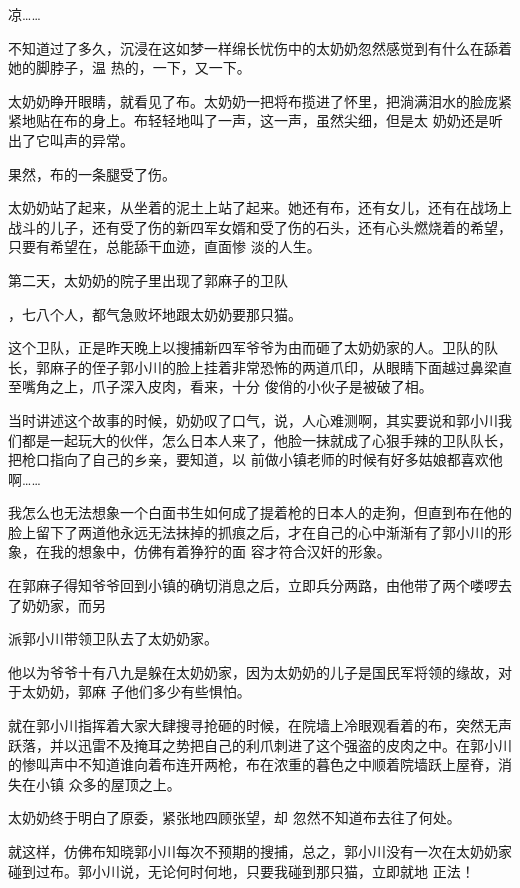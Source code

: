 \documentclass{article}
\begin{document}
凉…… 

不知道过了多久，沉浸在这如梦一样绵长忧伤中的太奶奶忽然感觉到有什么在舔着她的脚脖子，温
热的，一下，又一下。 

太奶奶睁开眼睛，就看见了布。太奶奶一把将布揽进了怀里，把淌满泪水的脸庞紧紧地贴在布的身上。布轻轻地叫了一声，这一声，虽然尖细，但是太
奶奶还是听出了它叫声的异常。 


果然，布的一条腿受了伤。 

太奶奶站了起来，从坐着的泥土上站了起来。她还有布，还有女儿，还有在战场上战斗的儿子，还有受了伤的新四军女婿和受了伤的石头，还有心头燃烧着的希望，只要有希望在，总能舔干血迹，直面惨
淡的人生。 

第二天，太奶奶的院子里出现了郭麻子的卫队

\newpage
，七八个人，都气急败坏地跟太奶奶要那只猫。 

这个卫队，正是昨天晚上以搜捕新四军爷爷为由而砸了太奶奶家的人。卫队的队长，郭麻子的侄子郭小川的脸上挂着非常恐怖的两道爪印，从眼睛下面越过鼻梁直至嘴角之上，爪子深入皮肉，看来，十分
俊俏的小伙子是被破了相。 

当时讲述这个故事的时候，奶奶叹了口气，说，人心难测啊，其实要说和郭小川我们都是一起玩大的伙伴，怎么日本人来了，他脸一抹就成了心狠手辣的卫队队长，把枪口指向了自己的乡亲，要知道，以
前做小镇老师的时候有好多姑娘都喜欢他啊…… 

我怎么也无法想象一个白面书生如何成了提着枪的日本人的走狗，但直到布在他的脸上留下了两道他永远无法抹掉的抓痕之后，才在自己的心中渐渐有了郭小川的形象，在我的想象中，仿佛有着狰狞的面
容才符合汉奸的形象。 

在郭麻子得知爷爷回到小镇的确切消息之后，立即兵分两路，由他带了两个喽啰去了奶奶家，而另
\newpage

派郭小川带领卫队去了太奶奶家。 

他以为爷爷十有八九是躲在太奶奶家，因为太奶奶的儿子是国民军将领的缘故，对于太奶奶，郭麻
子他们多少有些惧怕。 

就在郭小川指挥着大家大肆搜寻抢砸的时候，在院墙上冷眼观看着的布，突然无声跃落，并以迅雷不及掩耳之势把自己的利爪刺进了这个强盗的皮肉之中。在郭小川的惨叫声中不知道谁向着布连开两枪，布在浓重的暮色之中顺着院墙跃上屋脊，消失在小镇
众多的屋顶之上。 

太奶奶终于明白了原委，紧张地四顾张望，却
忽然不知道布去往了何处。 

就这样，仿佛布知晓郭小川每次不预期的搜捕，总之，郭小川没有一次在太奶奶家碰到过布。郭小川说，无论何时何地，只要我碰到那只猫，立即就地
正法！ 

\newpage
\end{document}
